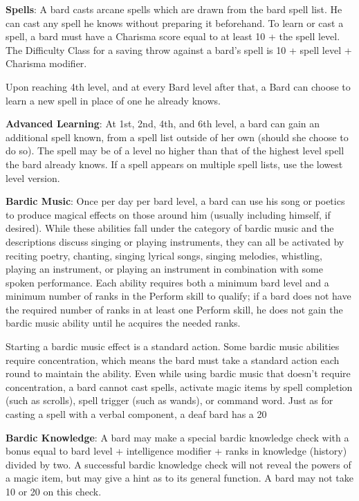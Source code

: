 \textbf{Spells}: A bard casts arcane spells which are drawn from the bard spell list. He can cast any spell he knows without preparing it beforehand. To learn or cast a spell, a bard must have a Charisma score equal to at least 10 + the spell level. The Difficulty Class for a saving throw against a bard's spell is 10 + spell level + Charisma modifier.

Upon reaching 4th level, and at every Bard level after that, a Bard can choose to learn a new spell in place of one he already knows. 

\textbf{Advanced Learning}: At 1st, 2nd, 4th, and 6th level, a bard can gain an additional spell known, from a spell list outside of her own (should she choose to do so). The spell may be of a level no higher than that of the highest level spell the bard already knows. If a spell appears on multiple spell lists, use the lowest level version.

\textbf{Bardic Music}: Once per day per bard level, a bard can use his song or poetics to produce magical effects on those around him (usually including himself, if desired). While these abilities fall under the category of bardic music and the descriptions discuss singing or playing instruments, they can all be activated by reciting poetry, chanting, singing lyrical songs, singing melodies, whistling, playing an instrument, or playing an instrument in combination with some spoken performance. Each ability requires both a minimum bard level and a minimum number of ranks in the Perform skill to qualify; if a bard does not have the required number of ranks in at least one Perform skill, he does not gain the bardic music ability until he acquires the needed ranks.

Starting a bardic music effect is a standard action. Some bardic music abilities require concentration, which means the bard must take a standard action each round to maintain the ability. Even while using bardic music that doesn’t require concentration, a bard cannot cast spells, activate magic items by spell completion (such as scrolls), spell trigger (such as wands), or command word. Just as for casting a spell with a verbal component, a deaf bard has a 20%

\textbf{Bardic Knowledge}: A bard may make a special bardic knowledge check with a bonus equal to bard level + intelligence modifier + ranks in knowledge (history) divided by two. A successful bardic knowledge check will not reveal the powers of a magic item, but may give a hint as to its general function. A bard may not take 10 or 20 on this check.

